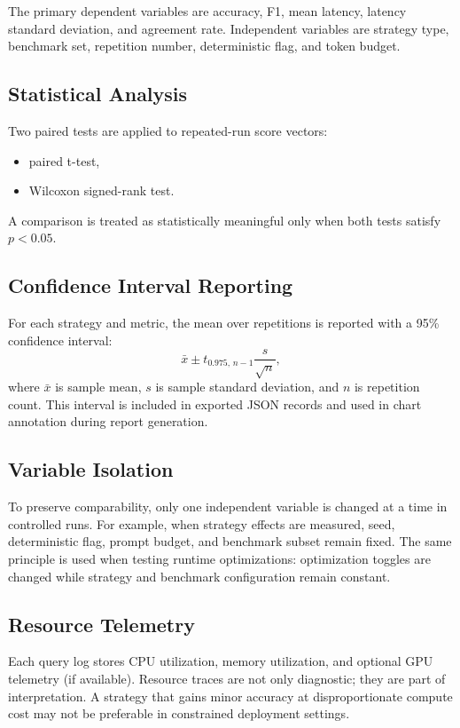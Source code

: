 \documentclass[conference]{IEEEtran}
\begin{document}
The primary dependent variables are accuracy, F1, mean latency, latency standard deviation, and agreement rate. Independent variables are strategy type, benchmark set, repetition number, deterministic flag, and token budget.

\subsection{Statistical Analysis}
Two paired tests are applied to repeated-run score vectors:
\begin{itemize}
  \item paired t-test,
  \item Wilcoxon signed-rank test.
\end{itemize}

A comparison is treated as statistically meaningful only when both tests satisfy $p<0.05$.

\subsection{Confidence Interval Reporting}
For each strategy and metric, the mean over repetitions is reported with a 95\% confidence interval:
\begin{equation}
\bar{x} \pm t_{0.975,\,n-1}\frac{s}{\sqrt{n}},
\end{equation}
where $\bar{x}$ is sample mean, $s$ is sample standard deviation, and $n$ is repetition count. This interval is included in exported JSON records and used in chart annotation during report generation.

\subsection{Variable Isolation}
To preserve comparability, only one independent variable is changed at a time in controlled runs. For example, when strategy effects are measured, seed, deterministic flag, prompt budget, and benchmark subset remain fixed. The same principle is used when testing runtime optimizations: optimization toggles are changed while strategy and benchmark configuration remain constant.

\subsection{Resource Telemetry}
Each query log stores CPU utilization, memory utilization, and optional GPU telemetry (if available). Resource traces are not only diagnostic; they are part of interpretation. A strategy that gains minor accuracy at disproportionate compute cost may not be preferable in constrained deployment settings.
\end{document}
